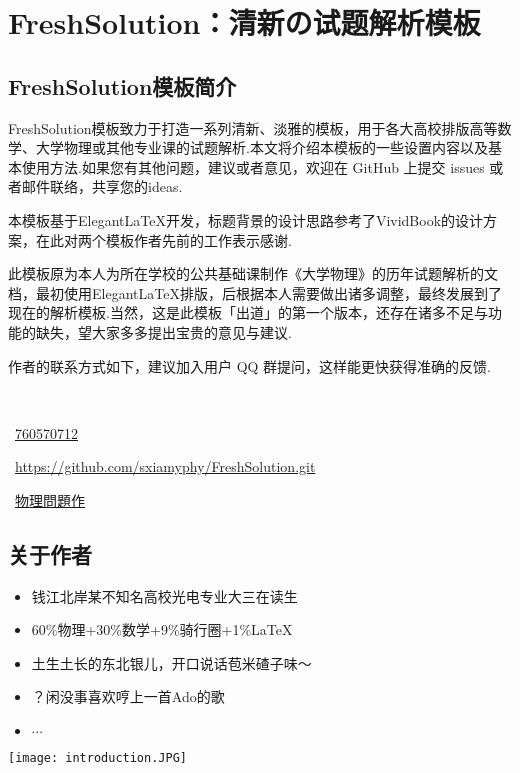 \chapter{FreshSolution：清新の试题解析模板}
\section{FreshSolution模板简介}
{
FreshSolution模板致力于打造一系列清新、淡雅的模板，用于各大高校排版高等数学、大学物理或其他专业课的试题解析.本文将介绍本模板的一些设置内容以及基本使用方法.如果您有其他问题，建议或者意见，欢迎在 GitHub 上提交 issues 或者邮件联络，共享您的ideas.

本模板基于Elegant\LaTeX 开发，标题背景的设计思路参考了VividBook的设计方案，在此对两个模板作者先前的工作表示感谢.

此模板原为本人为所在学校的公共基础课制作《大学物理》的历年试题解析的文档，最初使用Elegant\LaTeX 排版，后根据本人需要做出诸多调整，最终发展到了现在的解析模板.当然，这是此模板「出道」的第一个版本，还存在诸多不足与功能的缺失，望大家多多提出宝贵的意见与建议.

作者的联系方式如下，建议加入用户 QQ 群提问，这样能更快获得准确的反馈.

\begin{multicols}{2}

    \faEnvelope\ 
    
    \faQq\ \href{https://qm.qq.com/cgi-bin/qm/qr?k=gg5GsqSkGvZbC6TphVMlXRl08vqMV9Lw&authKey=rDcxqMdHwxWLQQBZwgfHduopCmVulM8CTWUhsGFOWyjqo6Ekk0omdoi4kuzxC/k4&noverify=0}{760570712}

    \faGithub\ \href{https://github.com/xiamyphys/FreshSolution.git}{https://github.com/sxiamyphy/FreshSolution.git}

    \faWechat\ \href{http://weixin.qq.com/r/hR1SSofEIdpercMp90iX}{物理問題作}
\end{multicols}
\begin{multicols}{2}
\section{关于作者}
\bfseries
    \begin{itemize}
        \item 钱江北岸某不知名高校光电专业大三在读生
        \item 60\%物理+30\%数学+9\%骑行圈+1\%\LaTeX
        \item 土生土长的东北银儿，开口说话苞米碴子味～
        \item ？闲没事喜欢哼上一首Ado的歌
        \item $\cdots$
    \end{itemize}
    \newcolumn
    \begin{center}
        \vspace{1em}
        \texttt{[image: introduction.JPG]}
    \end{center}
\end{multicols}
\newpage
}
